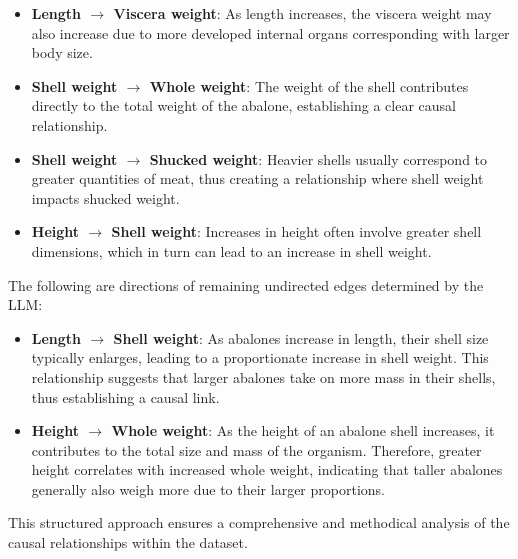 \documentclass{article}
\begin{document}
\begin{minipage}[t]{0.6\linewidth}
\begin{itemize}
            \item \textbf{Length $\rightarrow$ Viscera weight}: As length increases, the viscera weight may also increase due to more developed internal organs corresponding with larger body size.
                
            \item \textbf{Shell weight $\rightarrow$ Whole weight}: The weight of the shell contributes directly to the total weight of the abalone, establishing a clear causal relationship.
                
            \item \textbf{Shell weight $\rightarrow$ Shucked weight}: Heavier shells usually correspond to greater quantities of meat, thus creating a relationship where shell weight impacts shucked weight.
                
            \item \textbf{Height $\rightarrow$ Shell weight}: Increases in height often involve greater shell dimensions, which in turn can lead to an increase in shell weight.
                
        \end{itemize}
            
        The following are directions of remaining undirected edges determined by the LLM:
        \begin{itemize}

            \item \textbf{Length $\rightarrow$ Shell weight}: As abalones increase in length, their shell size typically enlarges, leading to a proportionate increase in shell weight. This relationship suggests that larger abalones take on more mass in their shells, thus establishing a causal link.

            
            \item \textbf{Height $\rightarrow$ Whole weight}: As the height of an abalone shell increases, it contributes to the total size and mass of the organism. Therefore, greater height correlates with increased whole weight, indicating that taller abalones generally also weigh more due to their larger proportions.

        \end{itemize}
            
        This structured approach ensures a comprehensive and methodical analysis of the causal relationships within the dataset.
        
\vfill
\end{minipage}
\end{document}
